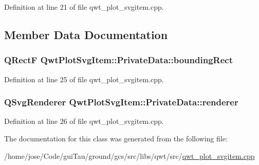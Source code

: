 Definition at line 21 of file qwt\-\_\-plot\-\_\-svgitem.\-cpp.



\subsection{Member Data Documentation}
\hypertarget{class_qwt_plot_svg_item_1_1_private_data_a7db9ec0baad77a4407732da79e1e30f1}{
\subsubsection[{bounding\-Rect}]{\setlength{\rightskip}{0pt plus 5cm}Q\-Rect\-F Qwt\-Plot\-Svg\-Item\-::\-Private\-Data\-::bounding\-Rect}}\label{class_qwt_plot_svg_item_1_1_private_data_a7db9ec0baad77a4407732da79e1e30f1}


Definition at line 25 of file qwt\-\_\-plot\-\_\-svgitem.\-cpp.

\hypertarget{class_qwt_plot_svg_item_1_1_private_data_aa8237f81f95d6c00f0e492d0f7cb3736}{
\subsubsection[{renderer}]{\setlength{\rightskip}{0pt plus 5cm}Q\-Svg\-Renderer Qwt\-Plot\-Svg\-Item\-::\-Private\-Data\-::renderer}}\label{class_qwt_plot_svg_item_1_1_private_data_aa8237f81f95d6c00f0e492d0f7cb3736}


Definition at line 26 of file qwt\-\_\-plot\-\_\-svgitem.\-cpp.



The documentation for this class was generated from the following file\-:\begin{DoxyCompactItemize}
\item 
/home/jose/\-Code/gui\-Tau/ground/gcs/src/libs/qwt/src/\hyperlink{qwt__plot__svgitem_8cpp}{qwt\-\_\-plot\-\_\-svgitem.\-cpp}\end{DoxyCompactItemize}
